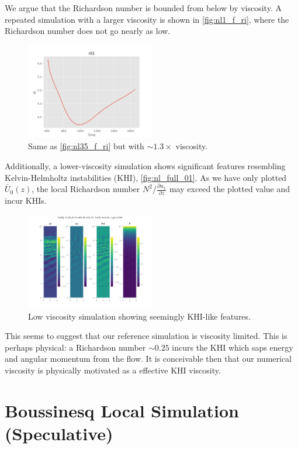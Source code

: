\documentclass[twocolumn,
        usenames, %
        dvipsnames %
    ]{revtex4-1}%
\newcommand*{\pd}[2]{\frac{\partial#1}{\partial#2}}
\begin{document}
We argue that the Richardson number is bounded from below by viscosity. A
repeated simulation with a larger viscosity is shown in \autoref{fig:nl1_f_ri},
where the Richardson number does not go nearly as low.
\begin{figure}[h]
    \centering
    \includegraphics[width=0.5\textwidth]{plots/nl1_f_ri.png}
    \caption{Same as \autoref{fig:nl35_f_ri} but with $\sim 1.3\times$
    viscosity.}\label{fig:nl1_f_ri}
\end{figure}

Additionally, a lower-viscosity simulation shows significant features resembling
Kelvin-Helmholtz instabilities (KHI), \autoref{fig:nl_full_01}. As we have only
plotted $\bar{U}_0(z)$, the local Richardson number $N^2 / \pd{u_x}{z}$ may
exceed the plotted value and incur KHIs.
\begin{figure}[h]
    \centering
    \includegraphics[width=0.5\textwidth]{plots/nl_full_01.png}
    \caption{Low viscosity simulation showing seemingly KHI-like
    features.}\label{fig:nl_full_01}
\end{figure}

This seems to suggest that our reference simulation is viscosity limited. This
is perhaps physical: a Richardson number $\sim 0.25$ incurs the KHI which saps
energy and angular momentum from the flow. It is conceivable then that our
numerical viscosity is physically motivated as a effective KHI viscosity.

\section{Boussinesq Local Simulation (Speculative)}\label{s:bouss}
\end{document}
